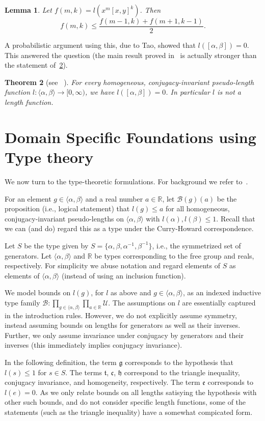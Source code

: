 \documentclass{amsart}
\theoremstyle{plain}
\newtheorem{theorem}{Theorem}[section]
\newtheorem{lemma}[theorem]{Lemma}
\theoremstyle{definition}
\theoremstyle{remark}
\newcommand{\R}{\mathbb{R}}
\newcommand{\F}{\langle \alpha, \beta \rangle}
\newcommand{\U}{\mathcal{U}}
\newcommand{\g}{\mathfrak{g}}
\renewcommand{\t}{\mathfrak{t}}
\renewcommand{\c}{\mathfrak{c}}
\newcommand{\h}{\mathfrak{h}}
\newcommand{\e}{\mathfrak{e}}
\newcommand{\B}{\mathcal{B}}
\begin{document}
\begin{lemma}
	Let $f(m,k)=l(x^m [x,y]^k)$. Then $$f(m,k)\leq \frac{f(m-1,k)+f(m+1,k-1)}{2}.$$
\end{lemma}

A probabilistic argument using this, due to Tao, showed that $l([\alpha, \beta])=0$. This answered the question (the main result proved in~\cite{polymath} is actually stronger than the statement of~\ref{main}).
\begin{theorem}[see ~\cite{polymath}]\label{main}
  For every homogeneous, conjugacy-invariant pseudo-length function $l:\F\to [0, \infty)$, we have $l([\alpha, \beta]) =0$. In particular $l$ is not a length function.
\end{theorem}

\section{Domain Specific Foundations using Type theory}\label{S:DSF}

We now turn to the type-theoretic formulations. For background we refer to~\cite{hott}.

For an element $g\in\F$ and a real number $a\in \R$, let $\B(g)(a)$ be the proposition (i.e., logical statement) that $l(g)\leq a$ for all homogeneous, conjugacy-invariant pseudo-lengths on $\F$ with $l(\alpha),l(\beta)\leq 1$. Recall that we can (and do) regard this as a type under the Curry-Howard correspondence.

Let $S$ be the type given by $S=\{\alpha, \beta, \alpha^{-1}, \beta^{-1}\}$, i.e., the symmetrized set of generators. Let  $\F$ and $\R$  be types corresponding to the free group and reals, respectively. For simplicity we abuse notation and regard elements of $S$ as elements of $\F$ (instead of using an inclusion function).

We model bounds on $l(g)$, for $l$ as above and $g\in\F$, as an indexed inductive type family $\B: \prod_{g\in \F}\prod_{a \in \R} \U$. The assumptions on $l$ are essentially captured in the introduction rules. However, we do not explicitly assume symmetry, instead assuming bounds on lengths for generators as well as their inverses. Further, we only assume invariance under conjugacy by generators and their inverses (this immediately implies conjugacy invariance).

In the following definition, the term $\g$ corresponds to the hypothesis that $l(s)\leq 1$ for $s\in S$.
 The terms $\t$, $\c$, $\h$  correspond to  the triangle inequality, conjugacy invariance, and  homogeneity, respectively. The term $\e$ corresponds to $l(e) =0$.
As we only relate bounds on all lengths satisying the hypothesis with other such bounds, and do not consider specific length functions, some of the statements (such as the triangle inequality) have a somewhat compicated form.
\end{document}
